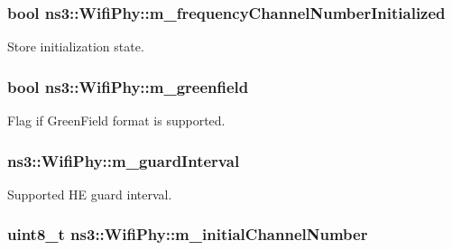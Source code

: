 \subsubsection[{\texorpdfstring{m\+\_\+frequency\+Channel\+Number\+Initialized}{m_frequencyChannelNumberInitialized}}]{\setlength{\rightskip}{0pt plus 5cm}bool ns3\+::\+Wifi\+Phy\+::m\+\_\+frequency\+Channel\+Number\+Initialized\hspace{0.3cm}{\ttfamily [private]}}\hypertarget{classns3_1_1WifiPhy_aac5b6bb7af0e3c2c3590ab1d893a34d2}{}\label{classns3_1_1WifiPhy_aac5b6bb7af0e3c2c3590ab1d893a34d2}


Store initialization state. 

\subsubsection[{\texorpdfstring{m\+\_\+greenfield}{m_greenfield}}]{\setlength{\rightskip}{0pt plus 5cm}bool ns3\+::\+Wifi\+Phy\+::m\+\_\+greenfield\hspace{0.3cm}{\ttfamily [private]}}\hypertarget{classns3_1_1WifiPhy_aed75cb200d7ff8b06c8eb651baef0d47}{}\label{classns3_1_1WifiPhy_aed75cb200d7ff8b06c8eb651baef0d47}


Flag if Green\+Field format is supported. 

\subsubsection[{\texorpdfstring{m\+\_\+guard\+Interval}{m_guardInterval}}]{ ns3\+::\+Wifi\+Phy\+::m\+\_\+guard\+Interval\hspace{0.3cm}{\ttfamily [private]}}\hypertarget{classns3_1_1WifiPhy_a2dc4ed4d032b37a87ac04628c0b3dd1e}{}\label{classns3_1_1WifiPhy_a2dc4ed4d032b37a87ac04628c0b3dd1e}


Supported HE guard interval. 

\subsubsection[{\texorpdfstring{m\+\_\+initial\+Channel\+Number}{m_initialChannelNumber}}]{\setlength{\rightskip}{0pt plus 5cm}uint8\+\_\+t ns3\+::\+Wifi\+Phy\+::m\+\_\+initial\+Channel\+Number\hspace{0.3cm}{\ttfamily [private]}}\hypertarget{classns3_1_1WifiPhy_a318e964855d1e96bfb3af870be9fc0a2}{}\label{classns3_1_1WifiPhy_a318e964855d1e96bfb3af870be9fc0a2}


